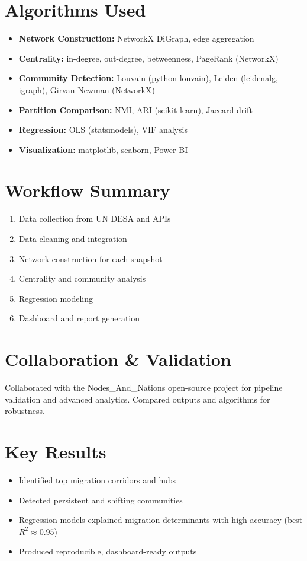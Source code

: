 \documentclass[12pt]{article}
\begin{document}
\section{Algorithms Used}
\begin{itemize}
  \item \textbf{Network Construction:} NetworkX DiGraph, edge aggregation
  \item \textbf{Centrality:} in-degree, out-degree, betweenness, PageRank (NetworkX)
  \item \textbf{Community Detection:} Louvain (python-louvain), Leiden (leidenalg, igraph), Girvan-Newman (NetworkX)
  \item \textbf{Partition Comparison:} NMI, ARI (scikit-learn), Jaccard drift
  \item \textbf{Regression:} OLS (statsmodels), VIF analysis
  \item \textbf{Visualization:} matplotlib, seaborn, Power BI
\end{itemize}

\section{Workflow Summary}
\begin{enumerate}
  \item Data collection from UN DESA and APIs
  \item Data cleaning and integration
  \item Network construction for each snapshot
  \item Centrality and community analysis
  \item Regression modeling
  \item Dashboard and report generation
\end{enumerate}

\section{Collaboration \& Validation}
Collaborated with the Nodes\_And\_Nations open-source project for pipeline validation and advanced analytics. Compared outputs and algorithms for robustness.

\section{Key Results}
\begin{itemize}
  \item Identified top migration corridors and hubs
  \item Detected persistent and shifting communities
  \item Regression models explained migration determinants with high accuracy (best $R^2 \approx 0.95$)
  \item Produced reproducible, dashboard-ready outputs
\end{itemize}
\end{document}
